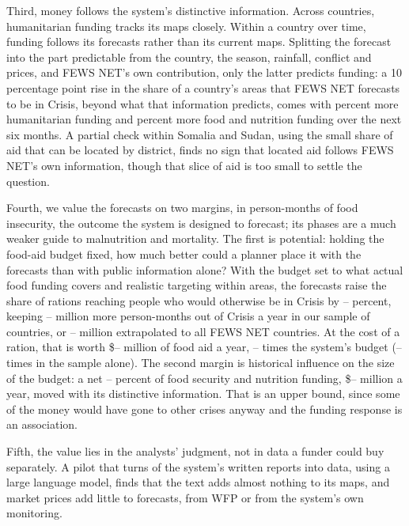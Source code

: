 \documentclass[11pt]{article}
\begin{document}
Third, money follows the system's distinctive information. Across countries, humanitarian funding tracks its maps closely. Within a country over time, funding follows its forecasts rather than its current maps. Splitting the forecast into the part predictable from the country, the season, rainfall, conflict and prices, and FEWS NET's own contribution, only the latter predicts funding: a 10 percentage point rise in the share of a country's areas that FEWS NET forecasts to be in Crisis, beyond what that information predicts, comes with \moneyRawAllContrib{} percent more humanitarian funding and \moneyRawFoodContrib{} percent more food and nutrition funding over the next six months. A partial check within Somalia and Sudan, using the small share of aid that can be located by district, finds no sign that located aid follows FEWS NET's own information, though that slice of aid is too small to settle the question.

Fourth, we value the forecasts on two margins, in person-months of food insecurity, the outcome the system is designed to forecast; its phases are a much weaker guide to malnutrition and mortality. The first is potential: holding the food-aid budget fixed, how much better could a planner place it with the forecasts than with public information alone? With the budget set to what actual food funding covers and realistic targeting within areas, the forecasts raise the share of rations reaching people who would otherwise be in Crisis by \vmHalfPctMore{}--\vmRandPctMore{} percent, keeping \vmHalfGain{}--\vmRandGain{} million more person-months out of Crisis a year in our sample of \vmCountries{} countries, or \vmHalfGainAll{}--\vmRandGainAll{} million extrapolated to all FEWS NET countries. At the cost of a ration, that is worth \$\vmHalfAidAll{}--\vmRandAidAll{} million of food aid a year, \vmHalfRatioAll{}--\vmRandRatioAll{} times the system's budget (\vmHalfRatio{}--\vmRandRatio{} times in the sample alone). The second margin is historical influence on the size of the budget: a net \envShareIpc{}--\envShareRaw{} percent of food security and nutrition funding, \$\envUsdLo{}--\envUsdHi{} million a year, moved with its distinctive information. That is an upper bound, since some of the money would have gone to other crises anyway and the funding response is an association.

Fifth, the value lies in the analysts' judgment, not in data a funder could buy separately. A pilot that turns \txtReports{} of the system's written reports into data, using a large language model, finds that the text adds almost nothing to its maps, and market prices add little to forecasts, from WFP or from the system's own monitoring.
\end{document}
